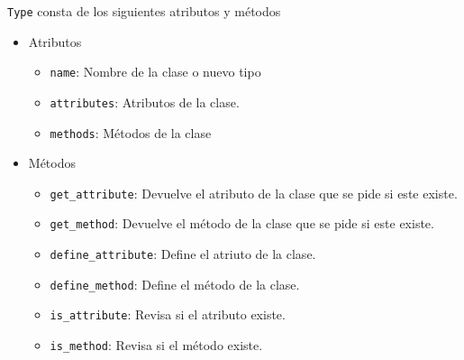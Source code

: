   \verb|Type| consta de los siguientes atributos y m\'etodos 
  \begin{itemize}
  \item Atributos
  \begin{itemize}
  \item \verb|name|: Nombre de la clase o nuevo tipo
  
  \item \verb|attributes|: Atributos de la clase.
  
  \item  \verb|methods|: M\'etodos de la clase
  \end{itemize}
  
  \item M\'etodos
  \begin{itemize}
  \item \verb|get_attribute|:  Devuelve el atributo de la clase que se pide si este existe.
  
  \item \verb|get_method|: Devuelve el m\'etodo de la clase que se pide si este existe.
  
  \item \verb|define_attribute|: Define el atriuto de la clase.
  
  \item \verb|define_method|: Define el m\'etodo de la clase.
  
  \item \verb|is_attribute|: Revisa si el atributo existe.
  
  \item \verb|is_method|: Revisa si el m\'etodo existe.
  \end{itemize}
  \end{itemize}

